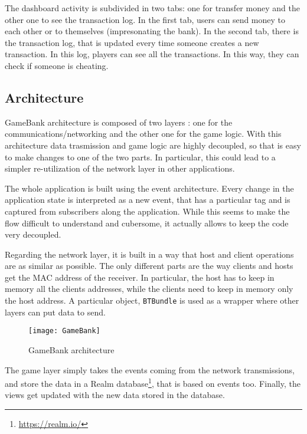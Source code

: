 The dashboard activity is subdivided in two tabs: one for transfer money and 
the other one to see the transaction log. In the first tab, users can send 
money to each other or to themselves (impresonating the bank). In the second 
tab, there is the transaction log, that is updated every time someone creates a 
new transaction. In this log, players can see all the transactions. In this 
way, they can check if someone is cheating. 

\subsection{Architecture}

GameBank architecture is composed of two layers : one 
for the communications/networking and the other one for the game logic. With 
this architecture data trasmission and game logic are highly decoupled, so that 
is easy to make changes to one of the two parts. In particular, this could lead 
to a simpler re-utilization of the network layer in other applications.

The whole application is built using the event architecture. Every change in 
the application state is interpreted as a new event, that has a particular tag 
and is captured from subscribers along the application. While this seems to 
make the flow difficult to understand and cubersome, it actually allows to keep 
the code very decoupled.

Regarding the network layer, it is built in a way that host and client 
operations are as similar as possible. The only different parts are the way 
clients and hosts get the MAC address of the receiver. In particular, the host 
has to keep in memory all the clients addresses, while the clients need to 
keep in memory only the host address. A particular object, \texttt{BTBundle} is 
used as a wrapper where other layers can put data to send.

\begin{figure}[t]
 \centering
 \texttt{[image: GameBank]}
 \caption{GameBank architecture}
 \label{fig:gbArchitecture}
\end{figure}

The game layer simply takes the events coming from the network transmissions, 
and store the data in a Realm database\footnote{\url{https://realm.io/}}, that 
is based on events too. Finally, the views get updated with the new data stored 
in the database.

